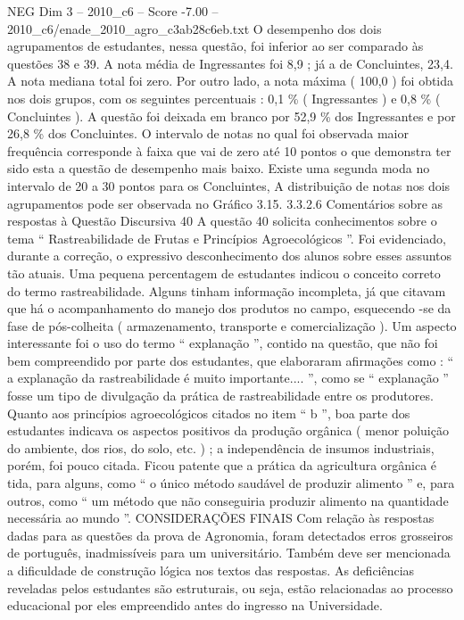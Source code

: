 \begin{textsample}{NEG Dim 3 – 2010\_c6 – Score -7.00 – 2010\_c6/enade\_2010\_agro\_c3ab28c6eb.txt}
O desempenho dos dois agrupamentos de estudantes, nessa questão, foi inferior ao ser comparado às questões 38 e 39.
A nota média de Ingressantes foi 8,9 ; já a de Concluintes, 23,4.
A nota mediana total foi zero.
Por outro lado, a nota máxima ( 100,0 ) foi obtida nos dois grupos, com os seguintes percentuais : 0,1 \% ( Ingressantes ) e 0,8 \% ( Concluintes ).
A questão foi deixada em branco por 52,9 \% dos Ingressantes e por 26,8 \% dos Concluintes.
O intervalo de notas no qual foi observada maior frequência corresponde à faixa que vai de zero até 10 pontos o que demonstra ter sido esta a questão de desempenho mais baixo.
Existe uma segunda moda no intervalo de 20 a 30 pontos para os Concluintes, A distribuição de notas nos dois agrupamentos pode ser observada no Gráfico 3.15. 3.3.2.6 Comentários sobre as respostas à Questão Discursiva 40 A questão 40 solicita conhecimentos sobre o tema “ Rastreabilidade de Frutas e Princípios Agroecológicos ”.
Foi evidenciado, durante a correção, o expressivo desconhecimento dos alunos sobre esses assuntos tão atuais.
Uma pequena percentagem de estudantes indicou o conceito correto do termo rastreabilidade.
Alguns tinham informação incompleta, já que citavam que há o acompanhamento do manejo dos produtos no campo, esquecendo -se da fase de pós-colheita ( armazenamento, transporte e comercialização ).
Um aspecto interessante foi o uso do termo “ explanação ”, contido na questão, que não foi bem compreendido por parte dos estudantes, que elaboraram afirmações como : “ a explanação da rastreabilidade é muito importante.... ”, como se “ explanação ” fosse um tipo de divulgação da prática de rastreabilidade entre os produtores.
Quanto aos princípios agroecológicos citados no item “ b ”, boa parte dos estudantes indicava os aspectos positivos da produção orgânica ( menor poluição do ambiente, dos rios, do solo, etc. ) ; a independência de insumos industriais, porém, foi pouco citada.
Ficou patente que a prática da agricultura orgânica é tida, para alguns, como “ o único método saudável de produzir alimento ” e, para outros, como “ um método que não conseguiria produzir alimento na quantidade necessária ao mundo ”.
CONSIDERAÇÕES FINAIS Com relação às respostas dadas para as questões da prova de Agronomia, foram detectados erros grosseiros de português, inadmissíveis para um universitário.
Também deve ser mencionada a dificuldade de construção lógica nos textos das respostas.
As deficiências reveladas pelos estudantes são estruturais, ou seja, estão relacionadas ao processo educacional por eles empreendido antes do ingresso na Universidade.

\end{textsample}
